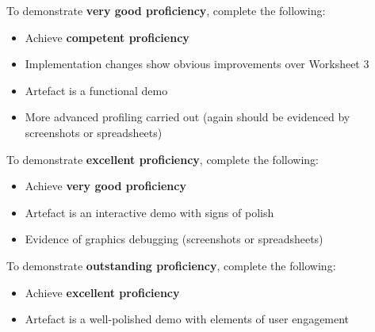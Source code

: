 \documentclass{../../../fal_assignment}
\begin{document}
To demonstrate \textbf{very good proficiency}, complete the following:
\begin{itemize}
	\item Achieve \textbf{competent proficiency}
	\item Implementation changes show obvious improvements over Worksheet 3
	\item Artefact is a functional demo
	\item More advanced profiling carried out (again should be evidenced by screenshots or spreadsheets)
\end{itemize}

To demonstrate \textbf{excellent proficiency}, complete the following:
\begin{itemize}
	\item Achieve \textbf{very good proficiency}
	\item Artefact is an interactive demo with signs of polish
	\item Evidence of graphics debugging (screenshots or spreadsheets)
\end{itemize}

To demonstrate \textbf{outstanding proficiency}, complete the following:
\begin{itemize}
	\item Achieve \textbf{excellent proficiency}
	\item Artefact is a well-polished demo with elements of user engagement
\end{itemize}
\end{document}
